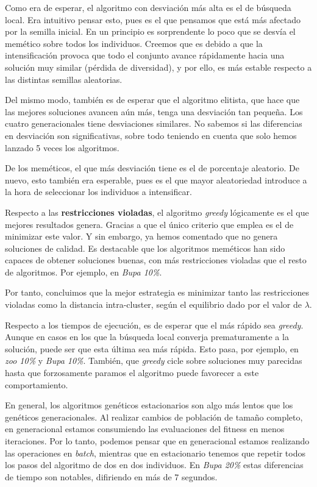\documentclass[11pt]{article}
\begin{document}
Como era de esperar, el algoritmo con desviación más alta es el de búsqueda local. Era intuitivo pensar esto, pues es el que pensamos que está más afectado por la semilla inicial. En un principio es sorprendente lo poco que se desvía el memético sobre todos los individuos. Creemos que es debido a que la intensificación provoca que todo el conjunto avance rápidamente hacia una solución muy similar (pérdida de diversidad), y por ello, es más estable respecto a las distintas semillas aleatorias.

Del mismo modo, también es de esperar que el algoritmo elitista, que hace que las mejores soluciones avancen aún más, tenga una desviación tan pequeña. Los cuatro generacionales tiene desviaciones similares. No sabemos si las diferencias en desviación son significativas, sobre todo teniendo en cuenta que solo hemos lanzado 5 veces los algoritmos.

De los meméticos, el que más desviación tiene es el de porcentaje aleatorio. De nuevo, esto también era esperable, pues es el que mayor aleatoriedad introduce a la hora de seleccionar los individuos a intensificar.

Respecto a las \textbf{restricciones violadas}, el algoritmo \emph{greedy} lógicamente es el que mejores resultados genera. Gracias a que el único criterio que emplea es el de minimizar este valor. Y sin embargo, ya hemos comentado que no genera soluciones de calidad. Es destacable que los algoritmos meméticos han sido capaces de obtener soluciones buenas, con más restricciones violadas que el resto de algoritmos. Por ejemplo, en \emph{Bupa 10\%}.

Por tanto, concluimos que la mejor estrategia es minimizar tanto las restricciones violadas como la distancia intra-cluster, según el equilibrio dado por el valor de $\lambda$.

Respecto a los tiempos de ejecución, es de esperar que el más rápido sea \emph{greedy}. Aunque en casos en los que la búsqueda local converja prematuramente a la solución, puede ser que esta última sea más rápida. Esto pasa, por ejemplo, en \emph{zoo 10\%} y \emph{Bupa 10\%}. También, que \emph{greedy} cicle sobre soluciones muy parecidas hasta que forzosamente paramos el algoritmo puede favorecer a este comportamiento.

En general, los algoritmos genéticos estacionarios son algo más lentos que los genéticos generacionales. Al realizar cambios de población de tamaño completo, en generacional estamos consumiendo las evaluaciones del fitness en menos iteraciones. Por lo tanto, podemos pensar que en generacional estamos realizando las operaciones en \emph{batch}, mientras que en estacionario tenemos que repetir todos los pasos del algoritmo de dos en dos individuos. En \emph{Bupa 20\%} estas diferencias de tiempo son notables, difiriendo en más de 7 segundos.
\end{document}
